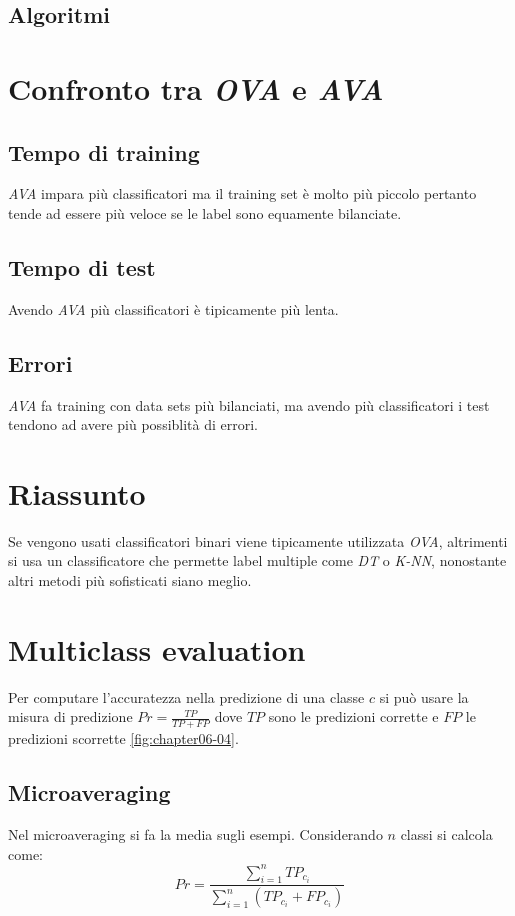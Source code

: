 	\subsection{Algoritmi}
	
	
	
	\section{Confronto tra \emph{OVA} e \emph{AVA}}
	
	\subsection{Tempo di training}
	\emph{AVA} impara pi\`u classificatori ma il training set \`e molto pi\`u piccolo pertanto tende ad essere pi\`u veloce se le label sono equamente bilanciate.
	
	\subsection{Tempo di test}
	Avendo \emph{AVA} pi\`u classificatori \`e tipicamente pi\`u lenta.
	
	\subsection{Errori}
	\emph{AVA} fa training con data sets pi\`u bilanciati, ma avendo pi\`u classificatori i test tendono ad avere pi\`u possiblit\`a di errori.

\section{Riassunto}
Se vengono usati classificatori binari viene tipicamente utilizzata  \emph{OVA}, altrimenti si usa un classificatore che permette label multiple come \emph{DT} o \emph{K-NN}, nonostante altri metodi pi\`u sofisticati siano meglio.

\section{Multiclass evaluation}
Per computare l'accuratezza nella predizione di una classe $c$ si pu\`o usare la misura di predizione $Pr=\frac{TP}{TP+FP}$ dove $TP$ sono le predizioni corrette e $FP$ le predizioni scorrette \ref{fig:chapter06-04}.

	\subsection{Microaveraging}
	Nel microaveraging si fa la media sugli esempi.
	Considerando $n$ classi si calcola come:
	$$Pr=\dfrac{\sum\limits_{i=1}^nTP_{c_i}}{\sum\limits_{i=1}^n(TP_{c_i}+FP_{c_i})}$$
	
